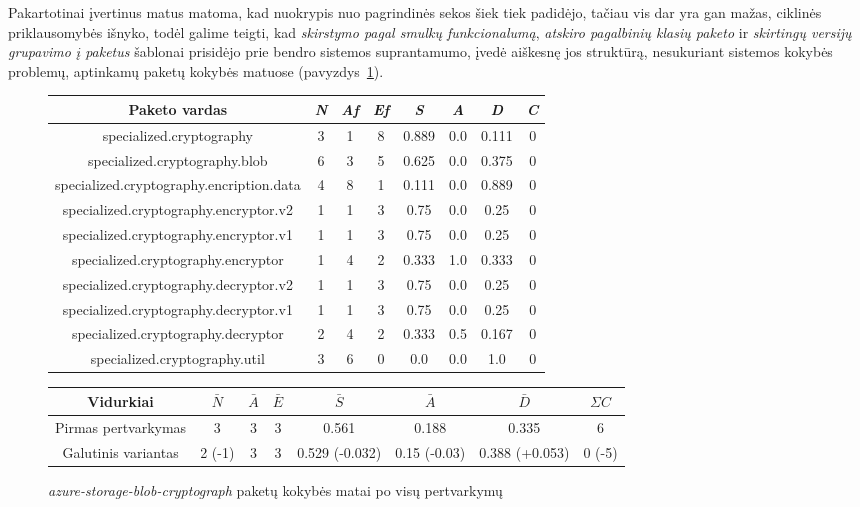 Pakartotinai įvertinus matus matoma, kad nuokrypis nuo pagrindinės sekos šiek tiek padidėjo, tačiau
vis dar yra gan mažas, ciklinės priklausomybės išnyko, todėl galime teigti, kad \textit{skirstymo pagal smulkų funkcionalumą},
\textit{atskiro pagalbinių klasių paketo} ir \textit{skirtingų versijų grupavimo į paketus} šablonai prisidėjo prie bendro
sistemos suprantamumo, įvedė aiškesnę jos struktūrą, nesukuriant sistemos kokybės problemų, aptinkamų paketų kokybės matuose (pavyzdys~\ref{table:verts}).
\begin{figure}[H]
\begin{center}
    \begin{tabular}{|c|c|c|c|c|c|c|c|}
        \hline
        Paketo vardas & \textit{N} & \textit{Af} & \textit{Ef} & \textit{S} & \textit{A} & \textit{D} & \textit{C} \\ [0.5ex]
        \hline\hline
        specialized.cryptography & 3 & 1 & 8 & 0.889 & 0.0 & 0.111 & 0 \\
        \hline
        specialized.cryptography.blob & 6 & 3 & 5 & 0.625 & 0.0 & 0.375 & 0 \\
        \hline
        specialized.cryptography.encription.data & 4 & 8 & 1 & 0.111 & 0.0 & 0.889 & 0 \\
        \hline
        specialized.cryptography.encryptor.v2 & 1 & 1 & 3 & 0.75 & 0.0 & 0.25 & 0 \\
        \hline
        specialized.cryptography.encryptor.v1 & 1 & 1 & 3 & 0.75 & 0.0 & 0.25 & 0 \\
        \hline
        specialized.cryptography.encryptor & 1 & 4 & 2 & 0.333 & 1.0 & 0.333 & 0 \\
        \hline
        specialized.cryptography.decryptor.v2 & 1 & 1 & 3 & 0.75 & 0.0 & 0.25 & 0 \\
        \hline
        specialized.cryptography.decryptor.v1 & 1 & 1 & 3 & 0.75 & 0.0 & 0.25 & 0 \\
        \hline
        specialized.cryptography.decryptor & 2 & 4 & 2 & 0.333 & 0.5 & 0.167 & 0 \\
        \hline
        specialized.cryptography.util & 3 & 6 & 0 & 0.0 & 0.0 & 1.0 & 0 \\
        \hline
    \end{tabular}
    \begin{tabular}{|c|c|c|c|c|c|c|c|}
        \hline
        Vidurkiai & $\bar{N}$ & $\bar{A}$ & $\bar{E}$ & $\bar{S}$ & $\bar{A}$ & $\bar{D}$ & $\Sigma C$ \\ [0.5ex]
        \hline\hline
        Pirmas pertvarkymas & 3 & 3 & 3 & 0.561 & 0.188 & 0.335 & 6 \\
        Galutinis variantas & \cellcolor{green!25} 2 (-1) & 3 & 3 & \cellcolor{green!25} 0.529 (-0.032) & \cellcolor{red!25} 0.15 (-0.03) & \cellcolor{red!25} 0.388 (+0.053) &  \cellcolor{green!25} 0 (-5) \\
        \hline
    \end{tabular}
\end{center}
\caption{\textit{azure-storage-blob-cryptograph} paketų kokybės matai po visų pertvarkymų}
\label{table:verts}
\end{figure}


